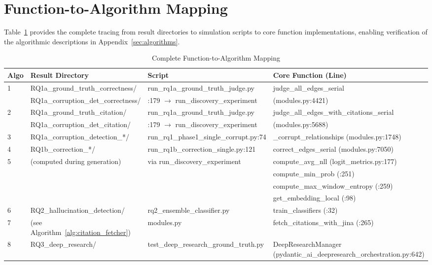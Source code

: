 \appendix

\section{Function-to-Algorithm Mapping}
\label{sec:function_mapping}

Table~\ref{tab:function_mapping} provides the complete tracing from result directories to simulation scripts to core function implementations, enabling verification of the algorithmic descriptions in Appendix~\ref{sec:algorithms}.

\begin{table}[H]
\centering
\caption{Complete Function-to-Algorithm Mapping}
\label{tab:function_mapping}
\footnotesize
\begin{tabularx}{\textwidth}{@{}l l l X@{}}
\toprule
\textbf{Algo} & \textbf{Result Directory} & \textbf{Script} & \textbf{Core Function (Line)} \\
\midrule
\multirow{2}{*}{1} & RQ1a\_ground\_truth\_correctness/ & run\_rq1a\_ground\_truth\_judge.py & judge\_all\_edges\_serial \\
 & RQ1a\_corruption\_det\_correctness/ & :179 $\rightarrow$ run\_discovery\_experiment & (modules.py:4421) \\
\midrule
\multirow{2}{*}{2} & RQ1a\_ground\_truth\_citation/ & run\_rq1a\_ground\_truth\_judge.py & judge\_all\_edges\_with\_citations\_serial \\
 & RQ1a\_corruption\_det\_citation/ & :179 $\rightarrow$ run\_discovery\_experiment & (modules.py:5688) \\
\midrule
3 & RQ1a\_corruption\_detection\_*/ & run\_rq1\_phase1\_single\_corrupt.py:74 & \_corrupt\_relationships (modules.py:1748) \\
\midrule
4 & RQ1b\_correction\_*/ & run\_rq1b\_correction\_single.py:121 & correct\_edges\_serial (modules.py:7050) \\
\midrule
\multirow{4}{*}{5} & \multirow{4}{*}{(computed during generation)} & \multirow{4}{*}{via run\_discovery\_experiment} & compute\_avg\_nll (logit\_metrics.py:177) \\
 & & & compute\_min\_prob (:251) \\
 & & & compute\_max\_window\_entropy (:259) \\
 & & & get\_embedding\_local (:98) \\
\midrule
6 & RQ2\_hallucination\_detection/ & rq2\_ensemble\_classifier.py & train\_classifiers (:32) \\
7 & (see Algorithm~\ref{alg:citation_fetcher}) & modules.py & fetch\_citations\_with\_jina (:265) \\
8 & RQ3\_deep\_research/ & test\_deep\_research\_ground\_truth.py & DeepResearchManager (pydantic\_ai\_deepresearch\_orchestration.py:642) \\
\bottomrule
\end{tabularx}
\end{table}

